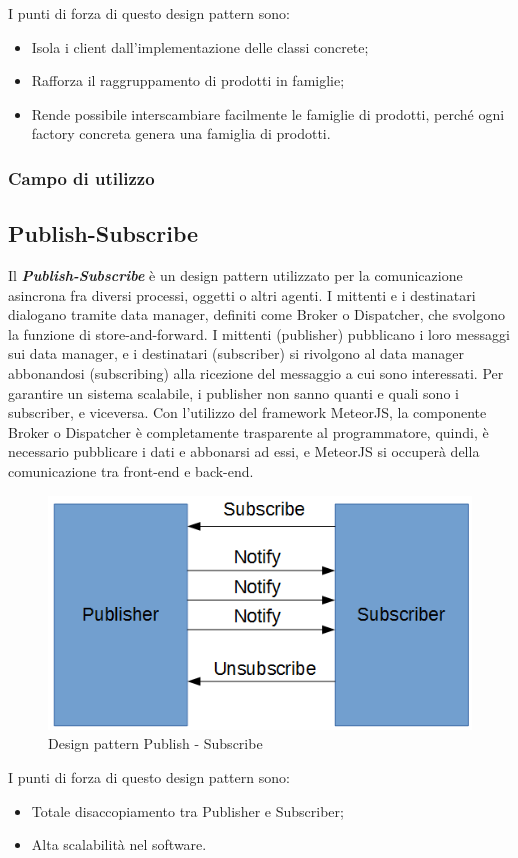 I punti di forza di questo design pattern sono:
\begin{itemize}
	\item Isola i client dall’implementazione delle classi concrete;
	\item Rafforza il raggruppamento di prodotti in famiglie;
	\item Rende possibile interscambiare facilmente le famiglie di prodotti, perché ogni factory concreta genera una famiglia di prodotti.
\end{itemize}

\subsubsection{Campo di utilizzo}

\subsection{Publish-Subscribe}
Il \textbf{\textit{Publish-Subscribe}} è un design pattern utilizzato per la comunicazione asincrona fra diversi processi, oggetti o altri agenti. I mittenti e i destinatari dialogano tramite data manager, definiti come Broker o Dispatcher, che svolgono la funzione di store-and-forward.
I mittenti (publisher) pubblicano i loro messaggi sui data manager, e i destinatari (subscriber) si rivolgono al data manager abbonandosi (subscribing) alla ricezione del messaggio a cui sono interessati. Per garantire un sistema scalabile, i publisher non sanno quanti e quali sono i subscriber, e viceversa. 
Con l'utilizzo del framework MeteorJS, la componente Broker o Dispatcher è completamente trasparente al programmatore, quindi, è necessario pubblicare i dati e abbonarsi ad essi, e MeteorJS si occuperà della comunicazione tra front-end e back-end.
\begin{figure}[H]
	\centering
	\includegraphics[width=0.5\linewidth]{IMG/pubsub}
	\caption{Design pattern Publish - Subscribe}
\end{figure}

I punti di forza di questo design pattern sono:
\begin{itemize}
	\item Totale disaccopiamento tra Publisher e Subscriber;
	\item Alta scalabilità nel software.
\end{itemize}

